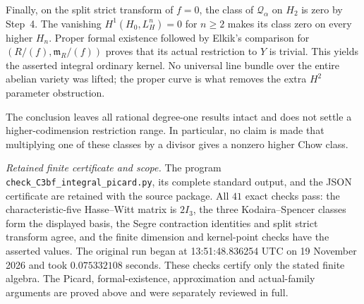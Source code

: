 Finally, on the split strict transform of $f=0$, the class of
$\mathcal Q_\alpha$ on $H_2$ is zero by Step~4. The vanishing
$H^1(H_0,L_H^n)=0$ for $n\ge2$ makes its class zero on every higher
$H_n$. Proper formal existence followed by Elkik's comparison for
$(R/(f),\mathfrak m_R/(f))$ proves that its actual restriction to
$Y$ is trivial. This yields the asserted integral ordinary kernel.
No universal line bundle over the entire abelian variety was lifted;
the proper curve is what removes the extra $H^2$ parameter obstruction.

The conclusion leaves all rational degree-one results intact and
does not settle a higher-codimension restriction range. In particular,
no claim is made that multiplying one of these classes by a divisor
gives a nonzero higher Chow class.

\emph{Retained finite certificate and scope.}
The program \texttt{check\_C3bf\_integral\_picard.py}, its complete
standard output, and the JSON certificate are retained with the
source package. All $41$ exact checks pass: the characteristic-five
Hasse--Witt matrix is $2I_3$, the three Kodaira--Spencer classes form
the displayed basis, the Segre contraction identities and split
strict transform agree, and the finite dimension and kernel-point
checks have the asserted values. The original run began at
13:51:48.836254 UTC on 19 November 2026 and took $0.075332108$ seconds.
These checks certify only the stated finite algebra. The Picard,
formal-existence, approximation and actual-family arguments are
proved above and were separately reviewed in full.
